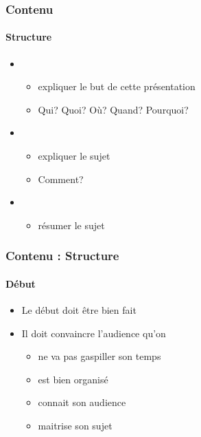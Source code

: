 \documentclass[xcolor=table, usenames,dvipsnames]{beamer}
\begin{document}
\begin{frame}
\frametitle{Contenu}
\framesubtitle{Structure}

\begin{itemize}
	\item {} 
	\begin{itemize}
		\item expliquer le but de cette présentation
		\item Qui? Quoi? Où? Quand? Pourquoi?
	\end{itemize}
	\item {}
	\begin{itemize}
		\item expliquer le sujet
		\item Comment?
	\end{itemize}
	\item {}
	\begin{itemize}
		\item résumer le sujet
	\end{itemize}
\end{itemize}

\end{frame}

\begin{frame}
\frametitle{Contenu : Structure}
\framesubtitle{Début}

\begin{itemize}
	\item Le début doit être bien fait
	\item Il doit convaincre l'audience qu'on 
	\begin{itemize}
		\item ne va pas gaspiller son temps
		\item est bien organisé
		\item connait son audience
		\item maitrise son sujet
	\end{itemize}
\end{itemize}

\end{frame}
\end{document}
